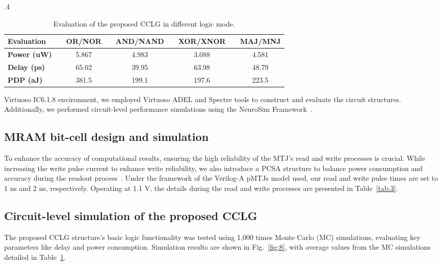\documentclass[submit]{elex2024}%
\begin{document}
\begin{table}[ht]
    \small
    \caption{Evaluation of the proposed CCLG in different logic mode.} 
    \label{tab:4}
    \centering
    \tabcolsep.4\tabcolsep
    \begin{tabular}{lcccccccc}
    \hline
    \textbf{Evaluation}     & \quad & \textbf{OR/NOR}     & \quad & \textbf{AND/NAND}       & \quad & \textbf{XOR/XNOR}      & \quad & \textbf{MAJ/MNJ}       \\
    \hline
    \textbf{Power (uW)}     & \quad & 5.867               & \quad & 4.983                   & \quad & 3.088                  & \quad & 4.581                  \\
    \hline
    \textbf{Delay (ps)}    	& \quad & 65.02               & \quad & 39.95                   & \quad & 63.98                  & \quad & 48.79                  \\
    \hline
    \textbf{PDP (aJ)}       & \quad & 381.5               & \quad & 199.1                   & \quad & 197.6                  & \quad & 223.5                  \\
    \hline
    \end{tabular}
\end{table}
Virtuoso IC6.1.8 environment, we employed Virtuoso ADEL and Spectre tools to construct and evaluate the circuit structures. Additionally, we performed circuit-level performance simulations using the NeuroSim Framework~\cite{33}. 

\subsection{MRAM bit-cell design and simulation}

To enhance the accuracy of computational results, ensuring the high reliability of the MTJ's read and write processes is crucial. While increasing the write pulse current to enhance write reliability, we also introduce a PCSA structure to balance power consumption and accuracy during the readout process~\cite{34}. Under the framework of the Verilog-A pMTJs model used, our read and write pulse times are set to 1 ns and 2 ns, respectively. Operating at 1.1 V, the details during the read and write processes are presented in Table~\ref{tab:3}.

\subsection{Circuit-level simulation of the proposed CCLG}
The proposed CCLG structure's basic logic functionality was tested using 1,000 times Monte Carlo (MC) simulations, evaluating key parameters like delay and power consumption. Simulation results are shown in Fig.~\ref{fig:8}, with average values from the MC simulations detailed in Table~\ref{tab:4}.
\end{document}
